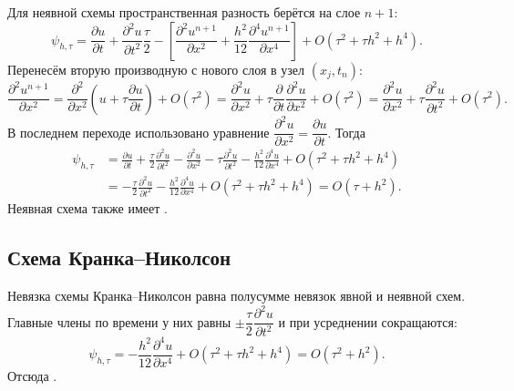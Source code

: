 \documentclass[../final.tex]{subfiles}
\begin{document}
Для неявной схемы пространственная разность берётся на слое $n+1$:
\begin{equation*}
    \psi_{h,\tau}
    =\frac{\partial u}{\partial t}
    +\frac{\partial^2u}{\partial t^2}\frac{\tau}{2}
    -\left[\frac{\partial^2u^{n+1}}{\partial x^2}
    +\frac{h^2}{12}\frac{\partial^4u^{n+1}}{\partial x^4}\right]
    +O(\tau^2+\tau h^2+h^4).
\end{equation*}
Перенесём вторую производную с нового слоя в узел $(x_j,t_n)$:
\begin{equation*}
    \frac{\partial^2u^{n+1}}{\partial x^2}
    =\frac{\partial^2}{\partial x^2}
    \left(u+\tau\frac{\partial u}{\partial t}\right)+O(\tau^2)
    =\frac{\partial^2u}{\partial x^2}
    +\tau\frac{\partial}{\partial t}\frac{\partial^2u}{\partial x^2}
    +O(\tau^2)
    =\frac{\partial^2u}{\partial x^2}
    +\tau\frac{\partial^2u}{\partial t^2}+O(\tau^2).
\end{equation*}
В последнем переходе использовано уравнение
$\dfrac{\partial^2u}{\partial x^2}=\dfrac{\partial u}{\partial t}$.
Тогда
\begin{align*}
    \psi_{h,\tau}
    &=\frac{\partial u}{\partial t}
    +\frac{\tau}{2}\frac{\partial^2u}{\partial t^2}
    -\frac{\partial^2u}{\partial x^2}
    -\tau\frac{\partial^2u}{\partial t^2}
    -\frac{h^2}{12}\frac{\partial^4u}{\partial x^4}
    +O(\tau^2+\tau h^2+h^4)\\
    &=-\frac{\tau}{2}\frac{\partial^2u}{\partial t^2}
    -\frac{h^2}{12}\frac{\partial^4u}{\partial x^4}
    +O(\tau^2+\tau h^2+h^4)=O(\tau+h^2).
\end{align*}
Неявная схема также имеет .

\subsection{Схема Кранка--Николсон}

Невязка схемы Кранка--Николсон равна полусумме невязок явной
и неявной схем. Главные члены по времени у них равны
$\pm\dfrac{\tau}{2}\dfrac{\partial^2u}{\partial t^2}$
и при усреднении сокращаются:
\begin{equation*}
    \psi_{h,\tau}
    =-\frac{h^2}{12}\frac{\partial^4u}{\partial x^4}
    +O(\tau^2+\tau h^2+h^4)=O(\tau^2+h^2).
\end{equation*}
Отсюда .
\end{document}

